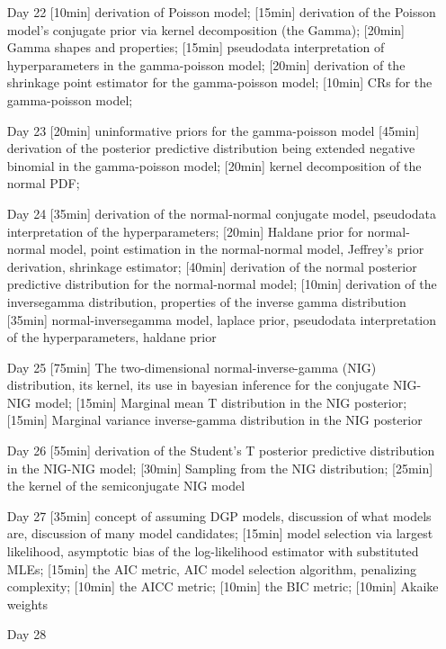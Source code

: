 \begin{enumerate}
\item[Day 22] [10min] derivation of Poisson model; [15min] derivation of the Poisson model's conjugate prior via kernel decomposition (the Gamma); [20min] Gamma shapes and properties; [15min] pseudodata interpretation of hyperparameters in the gamma-poisson model; [20min] derivation of the shrinkage point estimator for the gamma-poisson model; [10min] CRs for the gamma-poisson model; 

\item[Day 23] [20min] uninformative priors for the gamma-poisson model [45min] derivation of the posterior predictive distribution being extended negative binomial in the gamma-poisson model; [20min] kernel decomposition of the normal PDF; 

\item[Day 24] [35min] derivation of the normal-normal conjugate model, pseudodata interpretation of the hyperparameters; [20min] Haldane prior for normal-normal model, point estimation in the normal-normal model, Jeffrey's prior derivation, shrinkage estimator; [40min] derivation of the normal posterior predictive distribution for the normal-normal model; [10min] derivation of the inversegamma distribution, properties of the inverse gamma distribution [35min] normal-inversegamma model, laplace prior, pseudodata interpretation of the hyperparameters, haldane prior

\item[Day 25] [75min] The two-dimensional  normal-inverse-gamma (NIG) distribution, its kernel, its use in bayesian inference for the conjugate NIG-NIG model; [15min] Marginal mean T distribution in the NIG posterior; [15min] Marginal variance inverse-gamma distribution in the NIG posterior


\item[Day 26] [55min] derivation of the Student's T posterior predictive distribution in the NIG-NIG model; [30min] Sampling from the NIG distribution; [25min] the kernel of the semiconjugate NIG model

\item[Day 27] [35min] concept of assuming DGP models, discussion of what models are, discussion of many model candidates; [15min] model selection via largest likelihood, asymptotic bias of the log-likelihood estimator with substituted MLEs; [15min] the AIC metric, AIC model selection algorithm, penalizing complexity; [10min] the AICC metric; [10min] the BIC metric; [10min] Akaike weights

\item[Day 28] 

\end{enumerate}